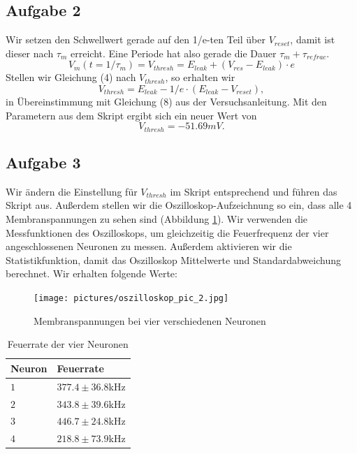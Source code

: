 \documentclass[10pt,a4paper]{scrartcl}
\begin{document}
\subsection{Aufgabe 2}
Wir setzen den Schwellwert gerade auf den 1/e-ten Teil über $V_{reset}$, damit ist dieser nach $\tau_m$ erreicht. Eine Periode hat also gerade die Dauer $\tau_m + \tau_{refrac}$.
\begin{equation}
V_m(t = 1 / \tau_m) = V_{thresh} = E_{leak} + (V_{res}-E_{leak})\cdot e
\end{equation}
Stellen wir Gleichung (4) nach $V_{thresh}$, so erhalten wir
\begin{equation}
V_{thresh} = E_{leak} - 1/e\cdot (E_{leak} - V_{reset}),
\end{equation}
in Übereinstimmung mit Gleichung (8) aus der Versuchsanleitung. Mit den Parametern aus dem Skript ergibt sich ein neuer Wert von 
\begin{equation}
V_{thresh}=-51.69mV.
\end{equation}


\subsection{Aufgabe 3}
Wir ändern die Einstellung für $V_{thresh}$ im Skript entsprechend und führen das Skript aus. Außerdem stellen wir die Oszilloskop-Aufzeichnung so ein, dass alle 4 Membranspannungen zu sehen sind (Abbildung \ref{fig:abb4}). Wir verwenden die Messfunktionen des Oszilloskops, um gleichzeitig die Feuerfrequenz der vier angeschlossenen Neuronen zu messen. Außerdem aktivieren wir die Statistikfunktion, damit das Oszilloskop Mittelwerte und Standardabweichung berechnet. Wir erhalten folgende Werte:

\begin{figure} [ht]
\begin{center}
\label{fig:abb4}
\caption{Membranspannungen bei vier verschiedenen Neuronen}
\texttt{[image: pictures/oszilloskop\_pic\_2.jpg]} 
\end{center}
\end{figure}

\begin{table}[H]
\centering
\captionsetup{justification=centering}
\caption{Feuerrate der vier Neuronen}
\begin{tabular}{l|l}
 Neuron&Feuerrate\\
\hline
$1$&$377.4 \pm 36.8$kHz\\
$2$&$343.8 \pm 39.6$kHz\\
$3$&$446.7 \pm 24.8$kHz\\
$4$&$218.8 \pm 73.9$kHz
\end{tabular}
\label{tab:01}
\end{table}
\end{document}
